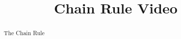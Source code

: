 \documentclass[handout]{ximera}
\title{Chain Rule Video}
\begin{document}
\begin{abstract}
The Chain Rule
\end{abstract}

\maketitle

\end{document}
